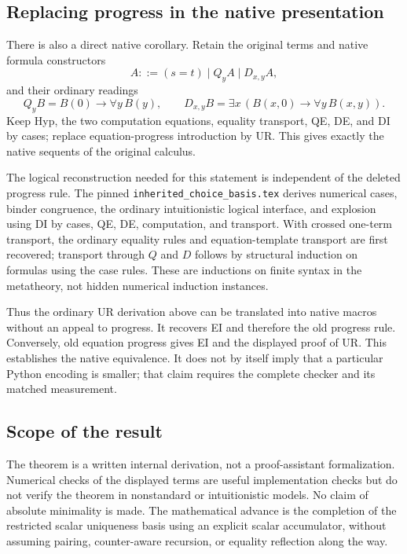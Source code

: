 \documentclass[11pt]{article}
\begin{document}
\subsection{Replacing progress in the native presentation}
There is also a direct native corollary.  Retain the original terms and
native formula constructors
\[
 A::=(s=t)\mid Q_y A\mid D_{x,y} A,
\]
and their ordinary readings
\[
 Q_y B=B(0)\to\forall y\,B(y),\qquad
 D_{x,y}B=\exists x\,(B(x,0)\to\forall y\,B(x,y)).
\]
Keep Hyp, the two computation equations, equality transport, QE, DE,
and DI by cases; replace equation-progress introduction by UR.
This gives exactly the native sequents of the original calculus.

The logical reconstruction needed for this statement is independent of
the deleted progress rule.  The pinned \texttt{inherited\_choice\_basis.tex}
derives numerical cases, binder congruence, the ordinary intuitionistic
logical interface, and explosion using DI by cases, QE, DE, computation,
and transport.  With crossed one-term transport, the ordinary equality
rules and equation-template transport are first recovered; transport
through $Q$ and $D$ follows by structural induction on formulas using
the case rules.  These are inductions on finite syntax in the metatheory,
not hidden numerical induction instances.

Thus the ordinary UR derivation above can be translated into native
macros without an appeal to progress.  It recovers EI and therefore the
old progress rule.  Conversely, old equation progress gives EI and
the displayed proof of UR.  This establishes the native equivalence.
It does not by itself imply that a particular Python encoding is smaller;
that claim requires the complete checker and its matched measurement.

\subsection{Scope of the result}
The theorem is a written internal derivation, not a proof-assistant
formalization.  Numerical checks of the displayed terms are useful
implementation checks but do not verify the theorem in nonstandard or
intuitionistic models.  No claim of absolute minimality is made.
The mathematical advance is the completion of the restricted scalar
uniqueness basis using an explicit scalar accumulator, without assuming
pairing, counter-aware recursion, or equality reflection along the way.

\end{document}
